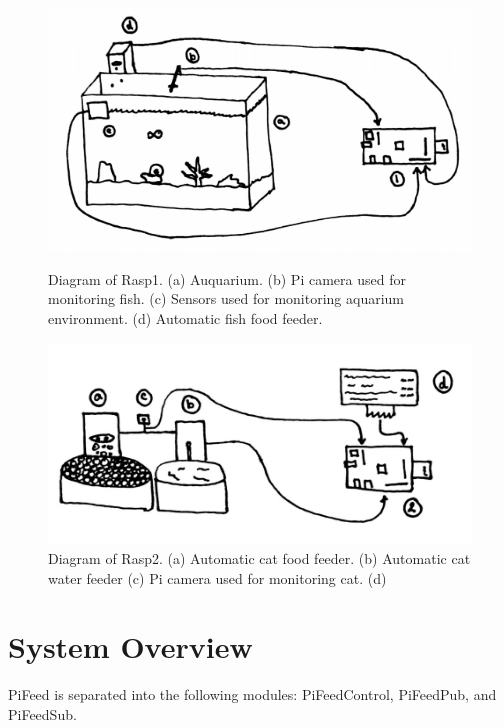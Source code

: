 \begin{figure}[H]
    \centering
    \begin{minipage}[b]{0.45\linewidth}
        \centering
        \captionsetup{justification=centering, margin = 0.5cm}
        \includegraphics[scale=0.3]{images/FishTank} 
        \caption{Diagram of Rasp1. (a) Auquarium. (b) Pi camera used for
        monitoring fish. (c) Sensors used for monitoring aquarium environment.
        (d) Automatic fish food feeder.}
        \label{fig:fig1}
    \end{minipage}
    \quad
    \begin{minipage}[b]{0.45\linewidth}
        \centering
        \captionsetup{justification=centering, margin = 0.5cm}
        \includegraphics[scale=0.4]{images/Cat} 
        \caption{Diagram of Rasp2. (a) Automatic cat food feeder. (b) Automatic
        cat water feeder (c) Pi camera used for monitoring cat. (d)}
        \label{fig:fig2}
    \end{minipage}
\end{figure}

\section{System Overview}
PiFeed is separated into the following modules: PiFeedControl, PiFeedPub, and
PiFeedSub.

